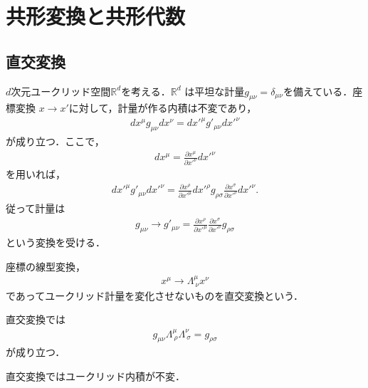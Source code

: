 \chapter{共形変換と共形代数}
\section{直交変換}
\(d\)次元ユークリッド空間\(\mathbb{R}^{d}\)を考える．\(\mathbb{R}^{d}\)
は平坦な計量\(g_{\mu\nu}=\delta_{\mu\nu}\)を備えている．座標変換
\(x\longrightarrow{}x'\)に対して，計量が作る内積は不変であり，
\begin{align}
	dx^{\mu}g_{\mu\nu}dx^{\nu}=dx'^{\mu}g'_{\mu\nu}dx'^{\nu}
\end{align}
が成り立つ．ここで，
\begin{align}
	dx^{\mu}=\frac{\partial{}x^{\mu}}{\partial{}x'^{\nu}}dx'^{\nu}
\end{align}
を用いれば，
\begin{align}
	dx'^{\mu}g'_{\mu\nu}dx'^{\nu}=\frac{\partial{}x^{\rho}}{\partial{}x'^{\mu}}dx'^{\rho}g_{\rho\sigma}\frac{\partial{}x^{\sigma}}{\partial{}x'^{\nu}}dx'^{\nu}.
\end{align}
従って計量は
\begin{align}
	g_{\mu\nu}\longrightarrow{}g'_{\mu\nu}=\frac{\partial{}x^{\rho}}{\partial{}x'^{\mu}}\frac{\partial{}x^{\sigma}}{\partial{}x'^{\nu}}g_{\rho\sigma}
\end{align}
という変換を受ける．
\begin{defn}[直交変換]
	座標の線型変換，
	\begin{align}
		x^{\mu}\longrightarrow{}\Lambda^{\mu}_{\ \nu}x^{\nu}
	\end{align}
	であってユークリッド計量を変化させないものを直交変換という．
\end{defn}
直交変換では
\begin{align}
	g_{\mu\nu}\Lambda^{\mu}_{\ \rho}\Lambda^{\nu}_{\ \sigma}=g_{\rho\sigma}
\end{align}
が成り立つ．
\begin{prop}
	直交変換ではユークリッド内積が不変．
\end{prop}
